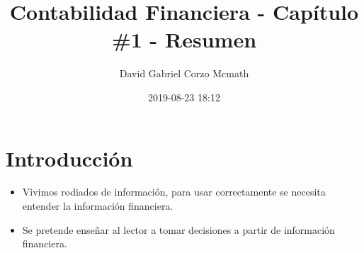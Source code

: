 \documentclass{article}
\author{David Gabriel Corzo Mcmath}
\title{Contabilidad Financiera - Capítulo \#1 - Resumen}
\date{2019-08-23 18:12}
\begin{document}
\maketitle



\section{Introducción}
\begin{itemize}
    \item Vivimos rodiados de información, para usar correctamente se necesita entender la información financiera.
    \item Se pretende enseñar al lector a tomar decisiones a partir de información financiera. 
\end{itemize}
\end{document}
